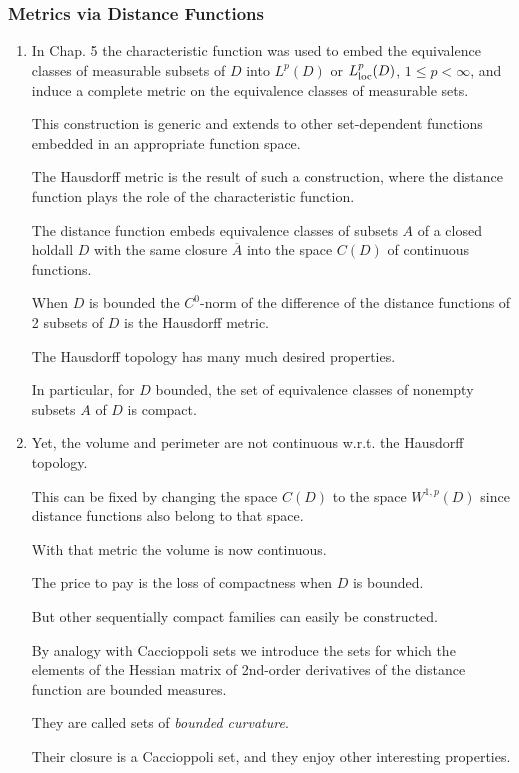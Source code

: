 \documentclass{book}
\numberwithin{equation}{section}
\begin{document}
\subsubsection{Metrics via Distance Functions}
\begin{enumerate}
    \item In Chap. 5 the characteristic function was used to embed the equivalence classes of measurable subsets of $D$ into $L^p(D)$ or $L_{\rm loc}^p(D)$, $1\le p < \infty$, and induce a complete metric on the equivalence classes of measurable sets.
    
    This construction is generic and extends to other set-dependent functions embedded in an appropriate function space.
    
    The Hausdorff metric is the result of such a construction, where the distance function plays the role of the characteristic function.
    
    The distance function embeds equivalence classes of subsets $A$ of a closed holdall $D$ with the same closure $\overline{A}$ into the space $C(D)$ of continuous functions.
    
    When $D$ is bounded the $C^0$-norm of the difference of the distance functions of 2 subsets of $D$ is the Hausdorff metric.
    
    The Hausdorff topology has many much desired properties.
    
    In particular, for $D$ bounded, the set of equivalence classes of nonempty subsets $A$ of $D$ is compact.
    \item Yet, the volume and perimeter are not continuous w.r.t. the Hausdorff topology.
    
    This can be fixed by changing the space $C(D)$ to the space $W^{1,p}(D)$ since distance functions also belong to that space.
    
    With that metric the volume is now continuous.
    
    The price to pay is the loss of compactness when $D$ is bounded.
    
    But other sequentially compact families can easily be constructed.
    
    By analogy with Caccioppoli sets we introduce the sets for which the elements of the Hessian matrix of 2nd-order derivatives of the distance function are bounded measures.
    
    They are called sets of \textit{bounded curvature}.
    
    Their closure is a Caccioppoli set, and they enjoy other interesting properties.
    

\end{enumerate}
\end{document}
